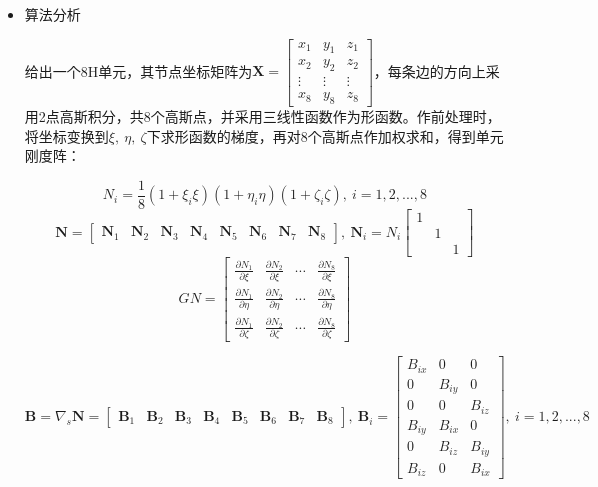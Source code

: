 \documentclass[UTF8]{ctexbook}
\begin{document}
\begin{itemize}
\item 算法分析

给出一个8H单元，其节点坐标矩阵为$\boldsymbol{X}=\begin{bmatrix}x_{1} & y_{1} & z_{1}\\
x_{2} & y_{2} & z_{2}\\
\vdots & \vdots & \vdots\\
x_{8} & y_{8} & z_{8}
\end{bmatrix}$，每条边的方向上采用2点高斯积分，共8个高斯点，并采用三线性函数作为形函数。作前处理时，将坐标变换到$\xi,\ \eta,\ \zeta$下求形函数的梯度，再对8个高斯点作加权求和，得到单元刚度阵：


\[
N_{i}=\frac{1}{8}(1+\xi_{i}\xi)(1+\eta_{i}\eta)(1+\zeta_{i}\zeta),\ i=1,2,...,8
\]
\[
\boldsymbol{N}=\begin{bmatrix}\boldsymbol{N}_{1} & \boldsymbol{N}_{2} & \boldsymbol{N}_{3} & \boldsymbol{N}_{4} & \boldsymbol{N}_{5} & \boldsymbol{N}_{6} & \boldsymbol{N}_{7} & \boldsymbol{N}_{8}\end{bmatrix},\ \boldsymbol{N}_{i}=N_{i}\begin{bmatrix}1\\
 & 1\\
 &  & 1
\end{bmatrix}
\]
\[
GN=\begin{bmatrix}\frac{\partial N_{1}}{\partial\xi} & \frac{\partial N_{2}}{\partial\xi} & \cdots & \frac{\partial N_{8}}{\partial\xi}\\
\frac{\partial N_{1}}{\partial\eta} & \frac{\partial N_{2}}{\partial\eta} & \cdots & \frac{\partial N_{8}}{\partial\eta}\\
\frac{\partial N_{1}}{\partial\zeta} & \frac{\partial N_{2}}{\partial\zeta} & \cdots & \frac{\partial N_{8}}{\partial\zeta}
\end{bmatrix}
\]



\[
\boldsymbol{B}=\nabla_{s}\boldsymbol{N}=\begin{bmatrix}\boldsymbol{B}_{1} & \boldsymbol{B}_{2} & \boldsymbol{B}_{3} & \boldsymbol{B}_{4} & \boldsymbol{B}_{5} & \boldsymbol{B}_{6} & \boldsymbol{B}_{7} & \boldsymbol{B}_{8}\end{bmatrix},\ \boldsymbol{B}_{i}=\begin{bmatrix}B_{ix} & 0 & 0\\
0 & B_{iy} & 0\\
0 & 0 & B_{iz}\\
B_{iy} & B_{ix} & 0\\
0 & B_{iz} & B_{iy}\\
B_{iz} & 0 & B_{ix}
\end{bmatrix},\ i=1,2,...,8
\]




\end{itemize}
\end{document}

